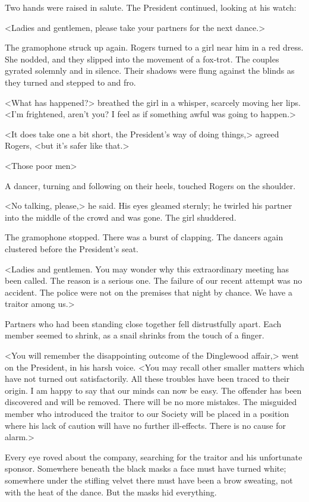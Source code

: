 Two hands were raised in salute. The President continued, looking at his watch:

<Ladies and gentlemen, please take your partners for the next dance.>

The gramophone struck up again. Rogers turned to a girl near him in a red dress. She nodded, and they slipped into the movement of a fox-trot. The couples gyrated solemnly and in silence. Their shadows were flung against the blinds as they turned and stepped to and fro.

<What has happened?> breathed the girl in a whisper, scarcely moving her lips. <I'm frightened, aren't you? I feel as if something awful was going to happen.>

<It does take one a bit short, the President's way of doing things,> agreed Rogers, <but it's safer like that.>

<Those poor men\longdash>

A dancer, turning and following on their heels, touched Rogers on the shoulder.

<No talking, please,> he said. His eyes gleamed sternly; he twirled his partner into the middle of the crowd and was gone. The girl shuddered.

The gramophone stopped. There was a burst of clapping. The dancers again clustered before the President's seat.

<Ladies and gentlemen. You may wonder why this extraordinary meeting has been called. The reason is a serious one. The failure of our recent attempt was no accident. The police were not on the premises that night by chance. We have a traitor among us.>

Partners who had been standing close together fell distrustfully apart. Each member seemed to shrink, as a snail shrinks from the touch of a finger.

<You will remember the disappointing outcome of the Dinglewood affair,> went on the President, in his harsh voice. <You may recall other smaller matters which have not turned out satisfactorily. All these troubles have been traced to their origin. I am happy to say that our minds can now be easy. The offender has been discovered and will be removed. There will be no more mistakes. The misguided member who introduced the traitor to our Society will be placed in a position where his lack of caution will have no further ill-effects. There is no cause for alarm.>

Every eye roved about the company, searching for the traitor and his unfortunate sponsor. Somewhere beneath the black masks a face must have turned white; somewhere under the stifling velvet there must have been a brow sweating, not with the heat of the dance. But the masks hid everything.


